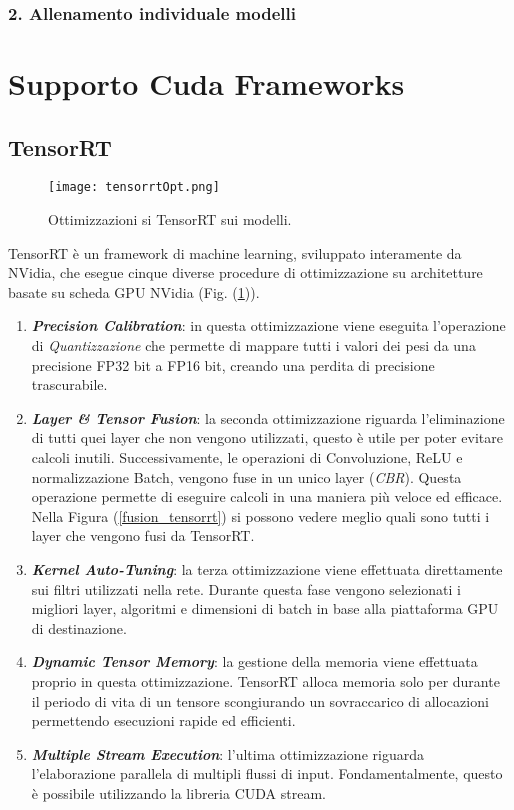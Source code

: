 \subsubsection{2. Allenamento individuale modelli}


\section{Supporto Cuda Frameworks}
\subsection{TensorRT}
\begin{figure}
    \centering
    \texttt{[image: tensorrtOpt.png]}
    \centering
    \caption{Ottimizzazioni si TensorRT sui modelli.}
    \label{tensorrt}
\end{figure}
TensorRT è un framework di machine learning, sviluppato interamente da 
NVidia, che esegue cinque diverse procedure di ottimizzazione su architetture 
basate su scheda GPU NVidia (Fig. (\ref{tensorrt})). 
\begin{enumerate}
    \item {\bfseries{\emph{Precision Calibration}}}: in questa ottimizzazione viene eseguita 
    l'operazione di \emph{Quantizzazione} che permette di mappare tutti i valori 
    dei pesi da una precisione FP32 bit a FP16 bit, creando una perdita 
    di precisione trascurabile.
    \item {\bfseries{\emph{Layer \& Tensor Fusion}}}: la seconda ottimizzazione riguarda l'eliminazione 
    di tutti quei layer che non vengono utilizzati, questo è 
    utile per poter evitare calcoli inutili. Successivamente, le operazioni 
    di Convoluzione, ReLU e normalizzazione Batch, vengono fuse in un 
    unico layer (\emph{CBR}). Questa operazione permette di eseguire calcoli 
    in una maniera più veloce ed efficace. Nella Figura (\ref{fusion_tensorrt}) si possono 
    vedere meglio quali sono tutti i layer che vengono fusi da TensorRT.
    \item {\bfseries{\emph{Kernel Auto-Tuning}}}: la terza ottimizzazione viene effettuata direttamente 
    sui filtri utilizzati nella rete. Durante questa fase vengono 
    selezionati i migliori layer, algoritmi e dimensioni di batch in base alla 
    piattaforma GPU di destinazione.
    \item {\bfseries{\emph{Dynamic Tensor Memory}}}: la gestione della memoria viene effettuata 
    proprio in questa ottimizzazione. TensorRT alloca memoria 
    solo per durante il periodo di vita di un tensore scongiurando un 
    sovraccarico di allocazioni permettendo esecuzioni rapide ed efficienti.
    \item {\bfseries{\emph{Multiple Stream Execution}}}: l'ultima ottimizzazione riguarda l'elaborazione 
    parallela di multipli flussi di input. Fondamentalmente, 
    questo è possibile utilizzando la libreria CUDA stream.
\end{enumerate}
